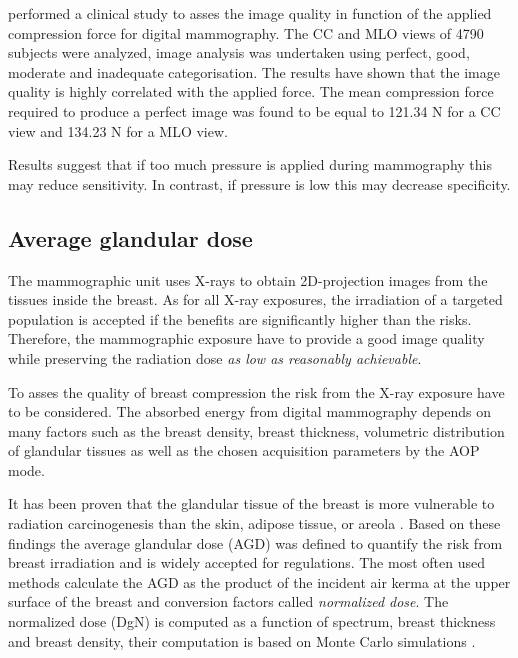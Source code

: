 \cite{oleary_compression_2011} performed a clinical study to asses the image quality in function of the applied compression force for digital mammography. The CC and MLO views of 4790 subjects were analyzed, image analysis was undertaken using perfect, good, moderate and
inadequate categorisation. The results have shown that the image quality is highly correlated with the applied force. The mean compression force required to produce a perfect image was found to be equal to 121.34 N for a CC view and 134.23 N for a MLO view.


Results suggest that if too much pressure is applied during mammography this may reduce sensitivity. In contrast, if pressure is low this may decrease specificity.

\subsection{Average glandular dose}
The mammographic unit uses X-rays to obtain 2D-projection images from the tissues inside the breast. As for all X-ray exposures, the irradiation of a targeted population is accepted if the benefits are significantly higher than the risks. Therefore, the mammographic exposure have to provide a good image quality while preserving the radiation dose \textit{as low as reasonably achievable}.

To asses the quality of breast compression  the risk from the X-ray exposure have to be considered.  The absorbed energy from digital mammography depends on many factors such as the breast density, breast thickness, volumetric  distribution of glandular tissues as well as the chosen acquisition parameters by the AOP mode. 

It has been proven that the glandular tissue of the breast is more vulnerable to radiation carcinogenesis than the skin, adipose tissue, or areola \citep{richard_absorbed_1979}. Based on these findings the average glandular dose (AGD) was defined to quantify the risk from breast irradiation and is widely accepted for regulations.  The most often used methods calculate the AGD as the product of the  incident air kerma at the upper surface of the breast  and  conversion factors called \textit{normalized dose}. The normalized dose (DgN)  is computed as a function of spectrum, breast thickness and breast density,  their computation is based on Monte Carlo simulations \citep{dance_additional_2000,boone_glandular_1999}. 

